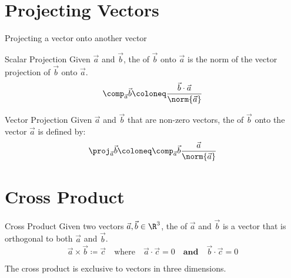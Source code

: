 \documentclass[12pt]{report}
\begin{document}
\section{Projecting Vectors}
\newcommand{\vectorproj}[2][]{\textit{proj}_{\vect{#1}}\vect{#2}}

Projecting a vector onto another vector

\begin{dfnbox}{Scalar Projection}{}
    Given $\vec{a}$ and $\vec{b}$, the  of $\vec{b}$ onto $\vec{a}$ is the norm of the vector projection of $\vec{b}$ onto $\vec{a}$.
    \tcblower
    \[ \comp_{\vec{a}} \vec{b} \coloneq \frac{\vec{b} \cdot \vec{a}}{\norm{\vec{a}}} \]
\end{dfnbox}

\begin{dfnbox}{Vector Projection}{}
    Given $\vec{a}$ and $\vec{b}$ that are non-zero vectors, the  of $\vec{b}$ onto the vector $\vec{a}$ is defined by:
    \[ \proj_{\vec{a}} \vec{b} \coloneq \comp_{\vec{a}} \vec{b} \frac{\vec{a}}{\norm{\vec{a}}} \]
\end{dfnbox}

\section{Cross Product}

\begin{dfnbox}{Cross Product}{}
    Given two vectors $\vec{a}, \vec{b} \in \R^3$, the  of $\vec{a}$ and $\vec{b}$ is a vector that is orthogonal to both $\vec{a}$ and $\vec{b}$.
    \tcblower
    \[ \vec{a} \times \vec{b} \coloneq \vec{c} \quad \text{where} \quad \vec{a} \cdot \vec{c} = 0 \quad \textbf{and} \quad \vec{b} \cdot \vec{c} = 0 \]
\end{dfnbox}

The cross product is exclusive to vectors in three dimensions.
\end{document}

